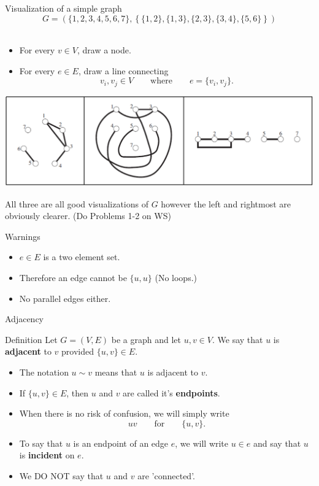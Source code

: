 \documentclass{beamer}
\def\bl[#1]#2{\begin{block}{#1}#2\end{block}}
\def\itemb{\begin{itemize}}
\def\iteme{\end{itemize}}
\begin{document}
\begin{frame}{Visualization of a simple graph}\vspace{-0.5cm}
\[
G=(\{1,2,3,4,5,6,7\},\left\{\{1,2\}, \{1,3\},\{2,3\},\{3,4\},\{5,6\}\right\})
\]\vspace{-0.4cm}\\
\itemb
\item For every $v\in V$, draw a node.
\item For every $e\in E$, draw a line connecting 
\[
v_i,v_j\in V\qquad\textrm{where}\qquad e=\{v_i,v_j\}.
\]
\iteme
\includegraphics[scale=0.45]{ExampleVisual.pdf}

All three are all good visualizations of $G$ however the left and rightmost are obviously clearer. (Do Problems 1-2 on WS)
\end{frame}

\begin{frame}{Warnings}
\itemb
\item $e\in E$ is a two element set.
\item Therefore an edge cannot be $\{u,u\}$ (No loops.)
\item No parallel edges either.
\iteme

\end{frame}

\begin{frame}{Adjacency}
\bl[Definition]{ Let $G=(V,E)$ be a graph and let $u,v\in V$. We say that $u$ is \textbf{adjacent} to $v$ provided $\{u,v\}\in E$. }
\itemb
\item The notation $u\sim v$ means that $u$ is adjacent to $v$.
\item If $\{u,v\}\in E$, then $u$ and $v$ are called it's \textbf{endpoints}.
\item When there is no risk of confusion, we will simply write 
\[
uv\qquad\textrm{for}\qquad \{u,v\}.
\]
\item To say that $u$ is an endpoint of an edge $e$, we will write $u\in e$ and say that $u$ is \textbf{incident} on $e$.
\item We DO NOT say that $u$ and $v$ are 'connected'.
\iteme
\end{frame}
\end{document}
